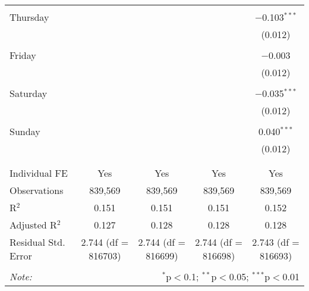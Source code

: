 \documentclass[
]{article}
\begin{document}
\begin{table}[!htbp]
{\begin{tabular}{@{\extracolsep{5pt}}lcccc}
  & & & & \\ 
 Thursday &  &  &  & $-$0.103$^{***}$ \\ 
  &  &  &  & (0.012) \\ 
  & & & & \\ 
 Friday &  &  &  & $-$0.003 \\ 
  &  &  &  & (0.012) \\ 
  & & & & \\ 
 Saturday &  &  &  & $-$0.035$^{***}$ \\ 
  &  &  &  & (0.012) \\ 
  & & & & \\ 
 Sunday &  &  &  & 0.040$^{***}$ \\ 
  &  &  &  & (0.012) \\ 
  & & & & \\ 
\hline \\[-1.8ex] 
Individual FE & Yes & Yes & Yes & Yes \\ 
Observations & 839,569 & 839,569 & 839,569 & 839,569 \\ 
R$^{2}$ & 0.151 & 0.151 & 0.151 & 0.152 \\ 
Adjusted R$^{2}$ & 0.127 & 0.128 & 0.128 & 0.128 \\ 
Residual Std. Error & 2.744 (df = 816703) & 2.744 (df = 816699) & 2.744 (df = 816698) & 2.743 (df = 816693) \\ 
\hline 
\hline \\[-1.8ex] 
\textit{Note:}  & \multicolumn{4}{r}{$^{*}$p$<$0.1; $^{**}$p$<$0.05; $^{***}$p$<$0.01} \\ 
\end{tabular}
} 
\end{table} 
\newpage
\end{document}
